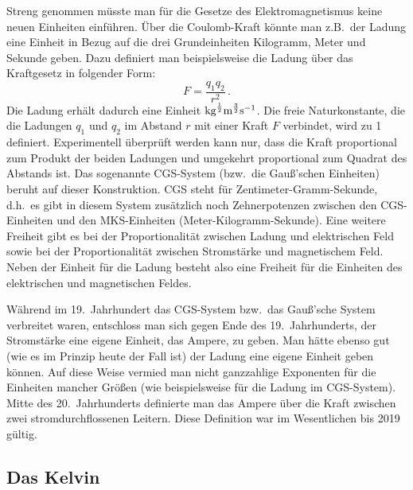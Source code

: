 Streng genommen m\"usste man f\"ur die Gesetze des Elektromagnetismus keine neuen
Einheiten einf\"uhren. \"Uber die Coulomb-Kraft k\"onnte man z.B.\ der Ladung eine Einheit
in Bezug auf die drei Grundeinheiten Kilogramm, Meter und Sekunde geben. Dazu definiert man
beispielsweise die Ladung \"uber das Kraftgesetz in folgender Form:
\begin{equation}
                 F = \frac{q_1 q_2}{r^2}  \, .
\end{equation}
Die Ladung erh\"alt dadurch eine Einheit ${\rm kg}^{\frac{1}{2}} {\rm m}^{\frac{3}{2}} {\rm s}^{-1}$. 
Die freie Naturkonstante, die die Ladungen $q_1$ und $q_2$ im Abstand $r$ mit einer Kraft $F$ verbindet,
wird zu 1 definiert. Experimentell \"uberpr\"uft werden kann nur, dass die Kraft proportional zum Produkt
der beiden Ladungen und umgekehrt proportional zum Quadrat des Abstands ist. 
Das sogenannte CGS-System
(bzw.\ die Gau\ss'schen Einheiten) beruht auf dieser Konstruktion. CGS steht f\"ur Zentimeter-Gramm-Sekunde,
d.h.\ es gibt in diesem System zus\"atzlich noch Zehnerpotenzen zwischen den CGS-Einheiten und den 
MKS-Einheiten (Meter-Kilogramm-Sekunde). Eine weitere Freiheit gibt es bei der Proportionalit\"at zwischen 
Ladung und elektrischen Feld sowie bei der Proportionalit\"at zwischen Stromst\"arke und magnetischem
Feld. Neben der Einheit f\"ur die Ladung besteht also eine Freiheit f\"ur die Einheiten des elektrischen und
magnetischen Feldes. 

W\"ahrend im 19.\ Jahrhundert das CGS-System bzw.\ das Gau\ss'sche System verbreitet waren, entschloss
man sich gegen Ende des 19.\ Jahrhunderts, der Stromst\"arke eine eigene Einheit, das Ampere, 
zu geben.
Man h\"atte ebenso gut (wie es im Prinzip heute der Fall ist) der Ladung eine eigene Einheit geben k\"onnen.  
Auf diese Weise vermied man nicht ganzzahlige Exponenten f\"ur die Einheiten mancher Gr\"o\ss en (wie
beispielsweise f\"ur die Ladung im CGS-System). Mitte des 20.\ Jahrhunderts definierte man das Ampere
\"uber die Kraft zwischen zwei stromdurchflossenen Leitern. Diese Definition war im Wesentlichen bis
2019 g\"ultig.  

\subsection{Das Kelvin}

